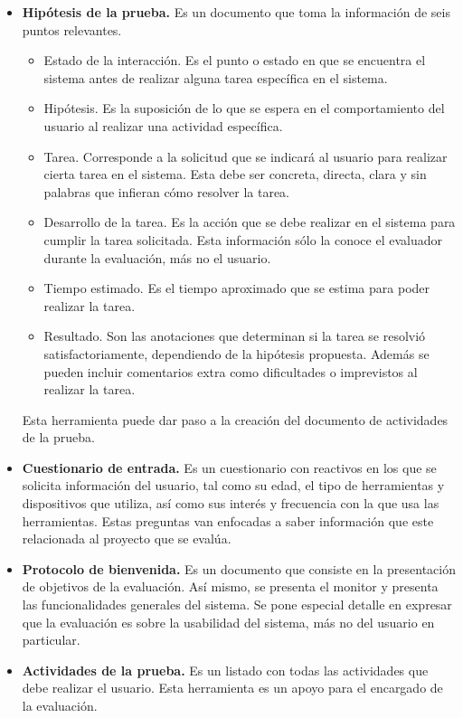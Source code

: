 \begin{itemize}
  \item \textbf{Hipótesis de la prueba.} Es un documento que toma la información de seis puntos relevantes.
  \begin{itemize}
    \item Estado de la interacción. Es el punto o estado en que se encuentra el sistema antes de realizar alguna tarea específica en el sistema.
    \item Hipótesis. Es la suposición de lo que se espera en el comportamiento del usuario al realizar una actividad específica.
    \item Tarea. Corresponde a la solicitud que se indicará al usuario para realizar cierta tarea en el sistema. Esta debe ser concreta, directa, clara y sin palabras que infieran cómo resolver la tarea.
    \item Desarrollo de la tarea. Es la acción que se debe realizar en el sistema para cumplir la tarea solicitada. Esta información sólo la conoce el evaluador durante la evaluación, más no el usuario.
    \item Tiempo estimado. Es el tiempo aproximado que se estima para poder realizar la tarea.
    \item Resultado. Son las anotaciones que determinan si la tarea se resolvió satisfactoriamente, dependiendo de la hipótesis propuesta. Además se pueden incluir comentarios extra como dificultades o imprevistos al realizar la tarea.
  \end{itemize}
  Esta herramienta puede dar paso a la creación del documento de actividades de la prueba.
  \item \textbf{Cuestionario de entrada.} Es un cuestionario con reactivos en los que se solicita información del usuario, tal como su edad, el tipo de herramientas y dispositivos que utiliza, así como sus interés y frecuencia con la que usa las herramientas. Estas preguntas van enfocadas a saber información que este relacionada al proyecto que se evalúa.
  \item \textbf{Protocolo de bienvenida.} Es un documento que consiste en la presentación de objetivos de la evaluación. Así mismo, se presenta el monitor y presenta las funcionalidades generales del sistema. Se pone especial detalle en expresar que la evaluación es sobre la usabilidad del sistema, más no del usuario en particular.
  \item \textbf{Actividades de la prueba.} Es un listado con todas las actividades que debe realizar el usuario. Esta herramienta es un apoyo para el encargado de la evaluación.

\end{itemize}
